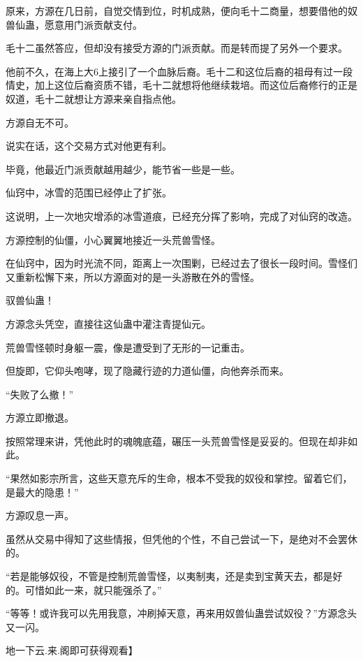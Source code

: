 \begin{this_body}
原来，方源在几日前，自觉交情到位，时机成熟，便向毛十二商量，想要借他的奴兽仙蛊，愿意用门派贡献支付。

毛十二虽然答应，但却没有接受方源的门派贡献。而是转而提了另外一个要求。

他前不久，在海上大6上接引了一个血脉后裔。毛十二和这位后裔的祖母有过一段情史，加上这位后裔资质不错，毛十二就想将他继续栽培。而这位后裔修行的正是奴道，毛十二就想让方源来亲自指点他。

方源自无不可。

说实在话，这个交易方式对他更有利。

毕竟，他最近门派贡献越用越少，能节省一些是一些。

仙窍中，冰雪的范围已经停止了扩张。

这说明，上一次地灾增添的冰雪道痕，已经充分挥了影响，完成了对仙窍的改造。

方源控制的仙僵，小心翼翼地接近一头荒兽雪怪。

在仙窍中，因为时光流不同，距离上一次围剿，已经过去了很长一段时间。雪怪们又重新松懈下来，所以方源面对的是一头游散在外的雪怪。

驭兽仙蛊！

方源念头凭空，直接往这仙蛊中灌注青提仙元。

荒兽雪怪顿时身躯一震，像是遭受到了无形的一记重击。

但旋即，它仰头咆哮，现了隐藏行迹的力道仙僵，向他奔杀而来。

“失败了么撤！”

方源立即撤退。

按照常理来讲，凭他此时的魂魄底蕴，碾压一头荒兽雪怪是妥妥的。但现在却非如此。

“果然如影宗所言，这些天意充斥的生命，根本不受我的奴役和掌控。留着它们，是最大的隐患！”

方源叹息一声。

虽然从交易中得知了这些情报，但凭他的个性，不自己尝试一下，是绝对不会罢休的。

“若是能够奴役，不管是控制荒兽雪怪，以夷制夷，还是卖到宝黄天去，都是好的。可惜如此一来，就只能强杀了。”

“等等！或许我可以先用我意，冲刷掉天意，再来用奴兽仙蛊尝试奴役？”方源念头又一闪。

地一下云.来.阁即可获得观看】

\end{this_body}

